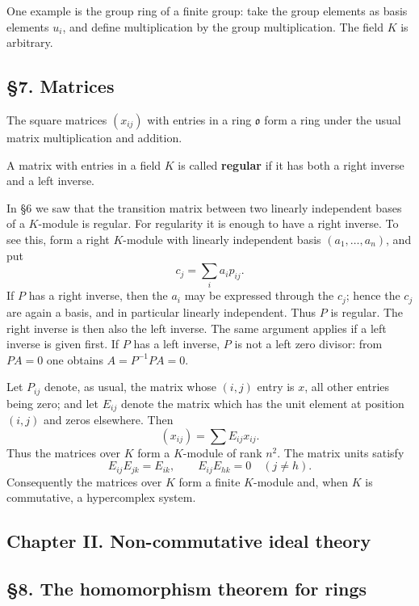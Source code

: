 \documentclass[11pt]{article}
\begin{document}
One example is the group ring of a finite group: take the group elements
as basis elements \(u_i\), and define multiplication by the group
multiplication. The field \(K\) is arbitrary.

\subsection{§7. Matrices}\label{matrices}

The square matrices \((x_{ij})\) with entries in a ring \(\mathfrak{o}\)
form a ring under the usual matrix multiplication and addition.

A matrix with entries in a field \(K\) is called \textbf{regular} if it
has both a right inverse and a left inverse.

In §6 we saw that the transition matrix between two linearly independent
bases of a \(K\)-module is regular. For regularity it is enough to have
a right inverse. To see this, form a right \(K\)-module with linearly
independent basis \((a_1,\ldots,a_n)\), and put \[
  c_j=\sum_i a_i p_{ij}.
\] If \(P\) has a right inverse, then the \(a_i\) may be expressed
through the \(c_j\); hence the \(c_j\) are again a basis, and in
particular linearly independent. Thus \(P\) is regular. The right
inverse is then also the left inverse. The same argument applies if a
left inverse is given first. If \(P\) has a left inverse, \(P\) is not a
left zero divisor: from \(PA=0\) one obtains \(A=P^{-1}PA=0\).

Let \(P_{ij}\) denote, as usual, the matrix whose \((i,j)\) entry is
\(x\), all other entries being zero; and let \(E_{ij}\) denote the
matrix which has the unit element at position \((i,j)\) and zeros
elsewhere. Then \[
  (x_{ij})=\sum E_{ij}x_{ij}.
\] Thus the matrices over \(K\) form a \(K\)-module of rank \(n^2\). The
matrix units satisfy \[
  E_{ij}E_{jk}=E_{ik},
  \qquad
  E_{ij}E_{hk}=0\quad (j\ne h).
\] Consequently the matrices over \(K\) form a finite \(K\)-module and,
when \(K\) is commutative, a hypercomplex system.

\subsection{Chapter II. Non-commutative ideal
theory}\label{chapter-ii.-non-commutative-ideal-theory}

\subsection{§8. The homomorphism theorem for
rings}\label{the-homomorphism-theorem-for-rings}
\end{document}
